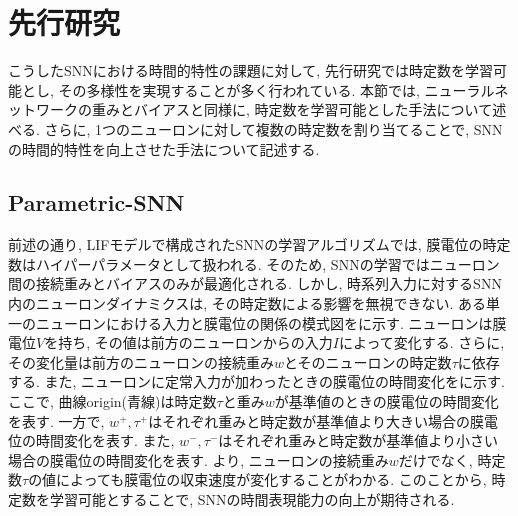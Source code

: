 \section{先行研究}
こうしたSNNにおける時間的特性の課題に対して, 先行研究では時定数を学習可能とし, その多様性を実現することが多く行われている\cite{dhsnn, yin2020effective, paramsnn}.
本節では, ニューラルネットワークの重みとバイアスと同様に, 時定数を学習可能とした手法について述べる.
さらに, 1つのニューロンに対して複数の時定数を割り当てることで, SNNの時間的特性を向上させた手法について記述する.

\subsection{Parametric-SNN}
前述の通り, LIFモデルで構成されたSNNの学習アルゴリズムでは, 膜電位の時定数はハイパーパラメータとして扱われる.
そのため, SNNの学習ではニューロン間の接続重みとバイアスのみが最適化される.
しかし, 時系列入力に対するSNN内のニューロンダイナミクスは, その時定数による影響を無視できない.
ある単一のニューロンにおける入力と膜電位の関係の模式図をに示す.
ニューロンは膜電位$V$を持ち, その値は前方のニューロンからの入力$I$によって変化する.
さらに, その変化量は前方のニューロンの接続重み$w$とそのニューロンの時定数$\tau$に依存する.
また, ニューロンに定常入力が加わったときの膜電位の時間変化をに示す.
ここで, 曲線origin(青線)は時定数$\tau$と重み$w$が基準値のときの膜電位の時間変化を表す.
一方で, $w^+, \tau^+$はそれぞれ重みと時定数が基準値より大きい場合の膜電位の時間変化を表す.
また, $w^-, \tau^-$はそれぞれ重みと時定数が基準値より小さい場合の膜電位の時間変化を表す.
より, ニューロンの接続重み$w$だけでなく, 時定数$\tau$の値によっても膜電位の収束速度が変化することがわかる.
このことから, 時定数を学習可能とすることで, SNNの時間表現能力の向上が期待される.
